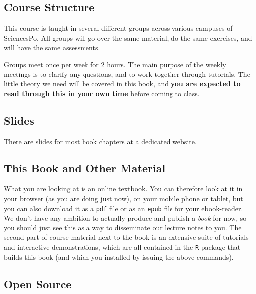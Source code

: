 \documentclass[]{book}
\begin{document}
\subsection*{Course Structure}\label{course-structure}

This course is taught in several different groups across various
campuses of SciencesPo. All groups will go over the same material, do
the same exercises, and will have the same assessments.

Groups meet once per week for 2 hours. The main purpose of the weekly
meetings is to clarify any questions, and to work together through
tutorials. The little theory we need will be covered in this book, and
\textbf{you are expected to read through this in your own time} before
coming to class.

\subsection*{Slides}\label{slides}

There are slides for most book chapters at a
\href{https://github.com/ScPoEcon/ScPoEconometrics-Slides}{dedicated
website}.

\subsection*{This Book and Other
Material}\label{this-book-and-other-material}

What you are looking at is an online textbook. You can therefore look at
it in your browser (as you are doing just now), on your mobile phone or
tablet, but you can also download it as a \texttt{pdf} file or as an
\texttt{epub} file for your ebook-reader. We don't have any ambition to
actually produce and publish a \emph{book} for now, so you should just
see this as a way to disseminate our lecture notes to you. The second
part of course material next to the book is an extensive suite of
tutorials and interactive demonstrations, which are all contained in the
\texttt{R} package that builds this book (and which you installed by
issuing the above commands).

\subsection*{Open Source}\label{open-source}
\end{document}
